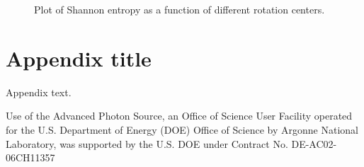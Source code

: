 \documentclass[pdf]{iucr}              %
\begin{document}
\begin{figure}
\centering
\caption{Plot of Shannon entropy as a function of different rotation centers.}
\label{fig:OptimizeCenter2}
\end{figure}


\appendix
\section{Appendix title}

Appendix text.



Use of the Advanced Photon Source, an Office of Science User Facility operated for the U.S. Department of Energy (DOE) Office of Science by Argonne National Laboratory, was supported by the U.S. DOE under Contract No. DE-AC02-06CH11357





 
\end{document}

